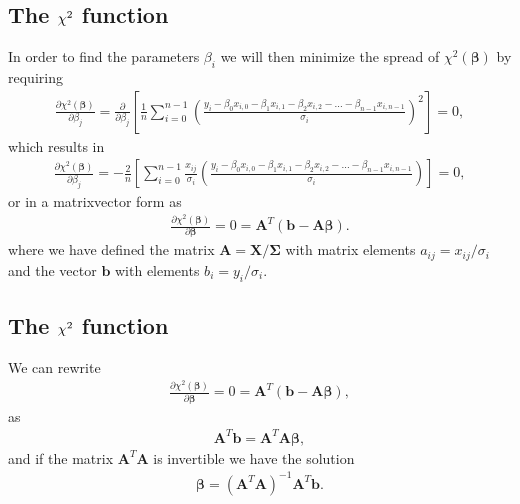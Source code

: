 \documentclass[letterpaper,10pt,english]{sphinxmanual}
\begin{document}
\subsection{The \protect\(\chi^2\protect\) function}
\label{\detokenize{chapter4:id4}}
In order to find the parameters \(\beta_i\) we will then minimize the spread of \(\chi^2(\boldsymbol{\beta})\) by requiring
\begin{equation*}
\begin{split}
\frac{\partial \chi^2(\boldsymbol{\beta})}{\partial \beta_j} = \frac{\partial }{\partial \beta_j}\left[ \frac{1}{n}\sum_{i=0}^{n-1}\left(\frac{y_i-\beta_0x_{i,0}-\beta_1x_{i,1}-\beta_2x_{i,2}-\dots-\beta_{n-1}x_{i,n-1}}{\sigma_i}\right)^2\right]=0,
\end{split}
\end{equation*}
which results in
\begin{equation*}
\begin{split}
\frac{\partial \chi^2(\boldsymbol{\beta})}{\partial \beta_j} = -\frac{2}{n}\left[ \sum_{i=0}^{n-1}\frac{x_{ij}}{\sigma_i}\left(\frac{y_i-\beta_0x_{i,0}-\beta_1x_{i,1}-\beta_2x_{i,2}-\dots-\beta_{n-1}x_{i,n-1}}{\sigma_i}\right)\right]=0,
\end{split}
\end{equation*}
or in a matrix\sphinxhyphen{}vector form as
\begin{equation*}
\begin{split}
\frac{\partial \chi^2(\boldsymbol{\beta})}{\partial \boldsymbol{\beta}} = 0 = \boldsymbol{A}^T\left( \boldsymbol{b}-\boldsymbol{A}\boldsymbol{\beta}\right).
\end{split}
\end{equation*}
where we have defined the matrix \(\boldsymbol{A} =\boldsymbol{X}/\boldsymbol{\Sigma}\) with matrix elements \(a_{ij} = x_{ij}/\sigma_i\) and the vector \(\boldsymbol{b}\) with elements \(b_i = y_i/\sigma_i\).


\subsection{The \protect\(\chi^2\protect\) function}
\label{\detokenize{chapter4:id5}}
We can rewrite
\begin{equation*}
\begin{split}
\frac{\partial \chi^2(\boldsymbol{\beta})}{\partial \boldsymbol{\beta}} = 0 = \boldsymbol{A}^T\left( \boldsymbol{b}-\boldsymbol{A}\boldsymbol{\beta}\right),
\end{split}
\end{equation*}
as
\begin{equation*}
\begin{split}
\boldsymbol{A}^T\boldsymbol{b} = \boldsymbol{A}^T\boldsymbol{A}\boldsymbol{\beta},
\end{split}
\end{equation*}
and if the matrix \(\boldsymbol{A}^T\boldsymbol{A}\) is invertible we have the solution
\begin{equation*}
\begin{split}
\boldsymbol{\beta} =\left(\boldsymbol{A}^T\boldsymbol{A}\right)^{-1}\boldsymbol{A}^T\boldsymbol{b}.
\end{split}
\end{equation*}
\end{document}
